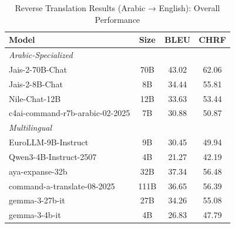 \begin{table}[htbp]
\centering
\caption{Reverse Translation Results (Arabic → English): Overall Performance}
\label{tab:reverse_overall}
\begin{tabular}{l@{\hspace{3pt}}c@{\hspace{3pt}}c@{\hspace{3pt}}c}
\toprule
Model & Size & BLEU & CHRF \\
\midrule
\multicolumn{4}{l}{\textit{Arabic-Specialized}} \\
\midrule
Jais-2-70B-Chat & 70B & 43.02 & 62.06 \\
Jais-2-8B-Chat & 8B & 34.44 & 55.81 \\
Nile-Chat-12B & 12B & 33.63 & 53.44 \\
c4ai-command-r7b-arabic-02-2025 & 7B & 30.88 & 50.87 \\
\midrule
\multicolumn{4}{l}{\textit{Multilingual}} \\
\midrule
EuroLLM-9B-Instruct & 9B & 30.45 & 49.94 \\
Qwen3-4B-Instruct-2507 & 4B & 21.27 & 42.19 \\
aya-expanse-32b & 32B & 37.34 & 56.48 \\
command-a-translate-08-2025 & 111B & 36.65 & 56.39 \\
gemma-3-27b-it & 27B & 34.26 & 55.08 \\
gemma-3-4b-it & 4B & 26.83 & 47.79 \\
\midrule
\bottomrule
\end{tabular}
\end{table}
